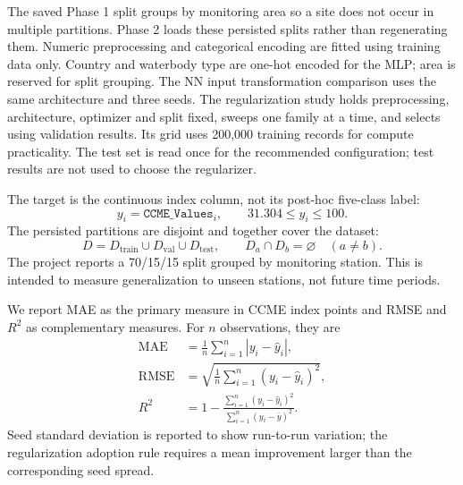 \documentclass[conference]{IEEEtran}
\begin{document}
The saved Phase 1 split groups by monitoring area so a site does not occur in multiple partitions. Phase 2 loads these persisted splits rather than regenerating them. Numeric preprocessing and categorical encoding are fitted using training data only. Country and waterbody type are one-hot encoded for the MLP; area is reserved for split grouping. The NN input transformation comparison uses the same architecture and three seeds. The regularization study holds preprocessing, architecture, optimizer and split fixed, sweeps one family at a time, and selects using validation results. Its grid uses 200,000 training records for compute practicality. The test set is read once for the recommended configuration; test results are not used to choose the regularizer.

The target is the continuous index column, not its post-hoc five-class label:
\begin{equation}
 y_i = \texttt{CCME\_Values}_i, \qquad 31.304 \le y_i \le 100.
\end{equation}
The persisted partitions are disjoint and together cover the dataset:
\begin{equation}
 D = D_{\mathrm{train}} \cup D_{\mathrm{val}} \cup D_{\mathrm{test}}, \qquad
 D_a \cap D_b = \varnothing \quad (a\ne b).
\end{equation}
The project reports a 70/15/15 split grouped by monitoring station. This is intended to measure generalization to unseen stations, not future time periods.

We report MAE as the primary measure in CCME index points and RMSE and $R^2$ as complementary measures. For $n$ observations, they are
\begin{align}
 \mathrm{MAE} &= \frac{1}{n}\sum_{i=1}^{n}|y_i-\hat y_i|,\\
 \mathrm{RMSE} &= \sqrt{\frac{1}{n}\sum_{i=1}^{n}(y_i-\hat y_i)^2},\\
 R^2 &= 1 - \frac{\sum_{i=1}^{n}(y_i-\hat y_i)^2}
 {\sum_{i=1}^{n}(y_i-\bar y)^2}.
\end{align}
Seed standard deviation is reported to show run-to-run variation; the regularization adoption rule requires a mean improvement larger than the corresponding seed spread.
\end{document}
